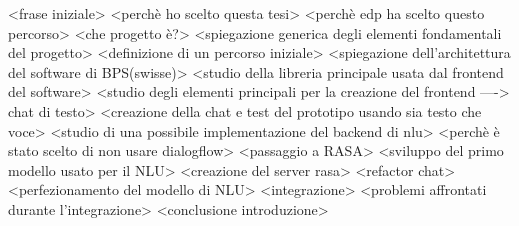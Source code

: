 <frase iniziale> 
<perchè ho scelto questa tesi>
<perchè edp ha scelto questo percorso>
<che progetto è?>
<spiegazione generica degli elementi fondamentali del progetto>
<definizione di un percorso iniziale>
<spiegazione dell'architettura del software di BPS(swisse)>
<studio della libreria principale usata dal frontend del software>
<studio degli elementi principali per la creazione del frontend ----> chat di testo>
<creazione della chat e test del prototipo usando sia testo che voce>
<studio di una possibile implementazione del backend di nlu>
<perchè è stato scelto di non usare dialogflow>
<passaggio a RASA>
<sviluppo del primo modello usato per il NLU>
<creazione del server rasa>
<refactor chat>
<perfezionamento del modello di NLU>
<integrazione>
<problemi affrontati durante l'integrazione>
<conclusione introduzione>
